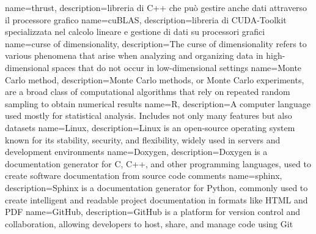 {
    name=\textnormal{thrust},
    description={libreria di C++ che può gestire anche dati attraverso il processore grafico}
}
{
    name=\textnormal{cuBLAS},
    description={libreria di CUDA-Toolkit specializzata nel calcolo lineare e gestione di dati su processori grafici}
}
{
name=\textnormal{curse of dimensionality},
description={The curse of dimensionality refers to various phenomena that arise when analyzing and organizing data in high-dimensional spaces that do not occur in low-dimensional settings}
}
{
	name=\textnormal{Monte Carlo method},
	description={Monte Carlo methods, or Monte Carlo experiments, are a broad class of computational algorithms that rely on repeated random sampling to obtain numerical results}
}
{
name=\textnormal{R},
description={A computer language used mostly for statistical analysis. Includes not only many features but also datasets}
}
{
name=\textnormal{Linux},
description={Linux is an open-source operating system known for its stability, security, and flexibility, widely used in servers and development environments}
}
{
name=\textnormal{Doxygen},
description={Doxygen is a documentation generator for C, C++, and other programming languages, used to create software documentation from source code comments}
}
{
name=\textnormal{sphinx},
description={Sphinx is a documentation generator for Python, commonly used to create intelligent and readable project documentation in formats like HTML and PDF}
}
{
name=\textnormal{GitHub},
description={GitHub is a platform for version control and collaboration, allowing developers to host, share, and manage code using Git}
}





